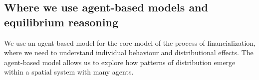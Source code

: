 


\subsection{Where we use agent-based models and equilibrium reasoning}
We use an agent-based model for the core model of the process of financialization, where we need to understand individual behaviour and distributional effects. %
The agent-based model allows us to explore how patterns of distribution emerge within a spatial system with many agents.



